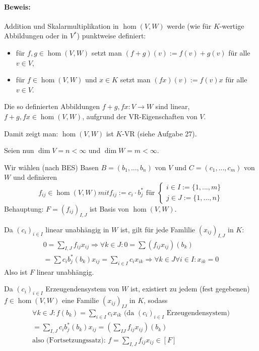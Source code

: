 \paragraph{Beweis:}
	Addition und Skalarmultiplikation in $\hom (V,W)$ werde (wie für $K$-wertige Abbildungen oder in $V^*$) punktweise definiert:
	\begin{itemize}
		\item für $f,g \in \hom (V,W)$ setzt man $(f+g)(v) := f(v) + g(v)$ für alle $v\in V$,
		\item für $f\in \hom (V,W)$ und $x\in K$ setzt man $(fx)(v) := f(v)x$ für alle $v\in V$.
	\end{itemize}
	Die so definierten Abbildungen $f+g,fx: V\to W$ sind linear, $f+g, fx\in \hom (V,W)$, aufgrund der VR-Eigenschaften von $V$.
	
	Damit zeigt man: $\hom (V,W)$ ist $K$-VR (siehe Aufgabe 27).
	
	Seien nun $\dim V = n < \infty$ und $\dim W = m < \infty$.
	
	Wir wählen (nach BES) Basen $B = (b_1,...,b_n)$ von $V$ und $C=(c_1,...,c_m)$ von $W$ und definieren
		\begin{equation*}
			f_{ij}\in \hom (V,W) mit f_{ij}:= c_i\cdot b_j^* \text{ für } 
				\begin{cases}
					i\in I := \{1,...,m\}\\
					j\in J := \{1,...,n\}
				\end{cases}
		\end{equation*}
	Behauptung: $F=(f_{ij})_{I,J}$ ist Basis von $\hom (V,W)$.
	
	Da $(c_i)_{i\in I}$ linear unabhängig in $W$ ist, gilt für jede Famlilie $(x_{ij})_{I,J}$ in $K$:
		\begin{gather*}
			0 = \sum_{I,J} f_{ij}x_{ij} \Rightarrow \forall k \in J: 0 = \sum (f_{ij}x_{ij})(b_k)\\
			= \sum c_i b_j^* (b_k) x_{ij} = \sum_{i\in I} c_ix_{ik} \Rightarrow \forall k\in J\forall i\in I:x_{ik} = 0
		\end{gather*}
	Also ist $F$ linear unabhängig.
	
	Da $(c_i)_{i\in I}$ Erzeugendensystem von $W$ ist, existiert zu jedem (fest gegebenen) $f\in\hom (V,W)$ eine Familie $(x_{ij})_{IJ}$ in $K$, sodass
		\begin{gather*}
		\forall k\in J: f(b_k) = \sum_{i\in I} c_i x_{ik} \text{ (da $(c_i)_{i\in I}$ Erzeugendensystem)}\\
		= \sum_{I,J}c_ib_j^*(b_k)x_{ij} = \left(\sum_{IJ} f_{ij}x_{ij}\right)(b_k)\\
		\text{also (Fortsetzungssatz): } f=\sum_{I,J}f_{ij}x_{ij} \in [F]
		\end{gather*}
	
